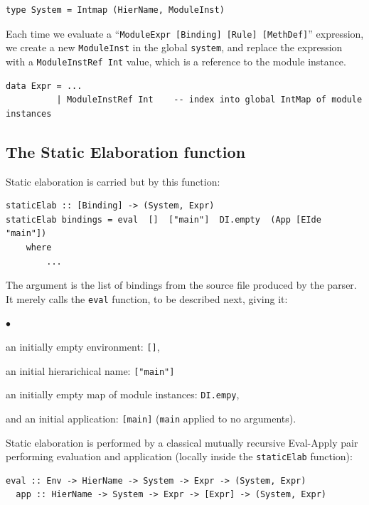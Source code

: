 \documentclass[11pt]{article}
\newenvironment{tightlist}%
{\begin{list}{$\bullet$}{%
    \setlength{\topsep}{0in}
    \setlength{\partopsep}{0in}
    \setlength{\itemsep}{0in}
    \setlength{\parsep}{0in}
    \setlength{\leftmargin}{1.5em}
    \setlength{\rightmargin}{0in}
    \setlength{\itemindent}{0in}
}
}%
{\end{list}
}
\newcommand{\term}[1]{\texttt{#1}}
\begin{document}
\begin{Verbatim}[frame=single, commandchars=\\\{\}]
type System = Intmap (HierName, ModuleInst)
\end{Verbatim}

Each time we evaluate a ``\verb|ModuleExpr [Binding] [Rule] [MethDef]|''
expression, we create a new \term{ModuleInst} in the global
\term{system}, and replace the expression with a \verb|ModuleInstRef Int|
value, which is a reference to the module instance.

\begin{Verbatim}[frame=single, commandchars=\\\{\}]
data Expr = ...
          | ModuleInstRef Int    -- index into global IntMap of module instances
\end{Verbatim}


\subsection{The Static Elaboration function}

Static elaboration is carried but by this function:

\begin{Verbatim}[frame=single, commandchars=\\\{\}]
staticElab :: [Binding] -> (System, Expr)
staticElab bindings = eval  []  ["main"]  DI.empty  (App [EIde "main"])
    where
        ...
\end{Verbatim}

The argument is the list of bindings from the source file produced by
the parser.  It merely calls the \term{eval} function, to be described
next, giving it:
\begin{tightlist}
\item an initially empty environment: \term{[]},
\item an initial hierarichical name: \term{["main"]}
\item an initially empty map of module instances: \term{DI.empy},
\item and an initial application: \term{[main]} (\term{main} applied to no arguments).
\end{tightlist}

Static elaboration is performed by a classical mutually recursive
Eval-Apply pair performing evaluation and application (locally inside
the \term{staticElab} function):

\begin{Verbatim}[frame=single, commandchars=\\\{\}]
  eval :: Env -> HierName -> System -> Expr -> (System, Expr)
  app :: HierName -> System -> Expr -> [Expr] -> (System, Expr)
\end{Verbatim}
\end{document}
